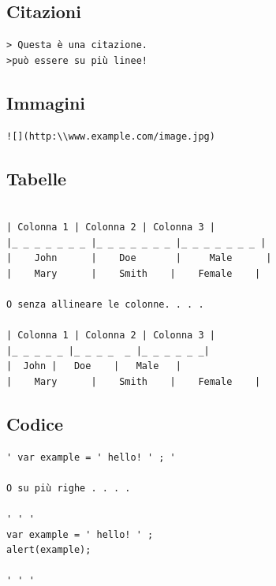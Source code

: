 \documentclass[12pt,a4paper]{article}
\begin{document}
\subsection{Citazioni}

\begin{verbatim}
> Questa è una citazione.
>può essere su più linee!
\end{verbatim}

\subsection{Immagini}
\begin{verbatim}
![](http:\\www.example.com/image.jpg)
\end{verbatim}

\subsection{Tabelle}
\begin{verbatim}

| Colonna 1 | Colonna 2 | Colonna 3 |
|_ _ _ _ _ _ _ |_ _ _ _ _ _ _ |_ _ _ _ _ _ _ |
|    John      |    Doe       |     Male      |
|    Mary      |    Smith    |    Female    |

O senza allineare le colonne. . . . 

| Colonna 1 | Colonna 2 | Colonna 3 |
|_ _ _ _ _ |_ _ _ _  _ |_ _ _ _ _ _|
|  John |   Doe    |   Male   |
|    Mary      |    Smith    |    Female    |

\end{verbatim}
	
\subsection{Codice}
\begin{verbatim}
' var example = ' hello! ' ; '

O su più righe . . . .

' ' ' 
var example = ' hello! ' ; 
alert(example);

' ' '

\end{verbatim}
\end{document}

